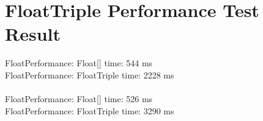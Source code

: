 
\section{FloatTriple Performance Test Result}
\label{sec:floattriple_performance_test_result}


FloatPerformance: Float[] time: 544 ms\\
FloatPerformance: FloatTriple time: 2228 ms
\\\\
FloatPerformance: Float[] time: 526 ms\\
FloatPerformance: FloatTriple time: 3290 ms